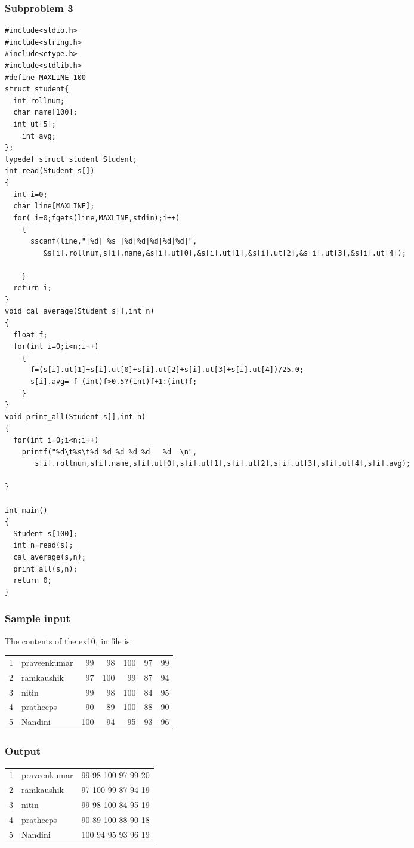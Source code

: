 \documentclass[11pt]{article}
\begin{document}
\subsubsection{Subproblem 3}
\label{sec-1-1-3}
\begin{verbatim}
#include<stdio.h>
#include<string.h>
#include<ctype.h>
#include<stdlib.h>
#define MAXLINE 100
struct student{
  int rollnum;
  char name[100];
  int ut[5];
    int avg; 
};
typedef struct student Student;
int read(Student s[])
{
  int i=0;
  char line[MAXLINE];
  for( i=0;fgets(line,MAXLINE,stdin);i++)
    {
      sscanf(line,"|%d| %s |%d|%d|%d|%d|%d|",
	     &s[i].rollnum,s[i].name,&s[i].ut[0],&s[i].ut[1],&s[i].ut[2],&s[i].ut[3],&s[i].ut[4]);

    }
  return i;
}
void cal_average(Student s[],int n)
{
  float f;
  for(int i=0;i<n;i++)
    {
      f=(s[i].ut[1]+s[i].ut[0]+s[i].ut[2]+s[i].ut[3]+s[i].ut[4])/25.0;
      s[i].avg= f-(int)f>0.5?(int)f+1:(int)f;
    }
}
void print_all(Student s[],int n)
{
  for(int i=0;i<n;i++)
	printf("%d\t%s\t%d %d %d %d %d   %d  \n",
	   s[i].rollnum,s[i].name,s[i].ut[0],s[i].ut[1],s[i].ut[2],s[i].ut[3],s[i].ut[4],s[i].avg);

}

int main()
{
  Student s[100];
  int n=read(s);
  cal_average(s,n);
  print_all(s,n); 
  return 0;
}
\end{verbatim}
\subsubsection{Sample input}
\label{sec-1-1-4}
The contents of the ex10$_{\text{1}}$.in file is
\begin{center}
\begin{tabular}{rlrrrrr}
1 & praveenkumar & 99 & 98 & 100 & 97 & 99\\
2 & ramkaushik & 97 & 100 & 99 & 87 & 94\\
3 & nitin & 99 & 98 & 100 & 84 & 95\\
4 & pratheeps & 90 & 89 & 100 & 88 & 90\\
5 & Nandini & 100 & 94 & 95 & 93 & 96\\
\end{tabular}
\end{center}


\subsubsection{Output}
\label{sec-1-1-5}

\begin{center}
\begin{tabular}{rll}
1 & praveenkumar & 99 98 100 97 99   20\\
2 & ramkaushik & 97 100 99 87 94   19\\
3 & nitin & 99 98 100 84 95   19\\
4 & pratheeps & 90 89 100 88 90   18\\
5 & Nandini & 100 94 95 93 96   19\\
\end{tabular}
\end{center}
\end{document}
